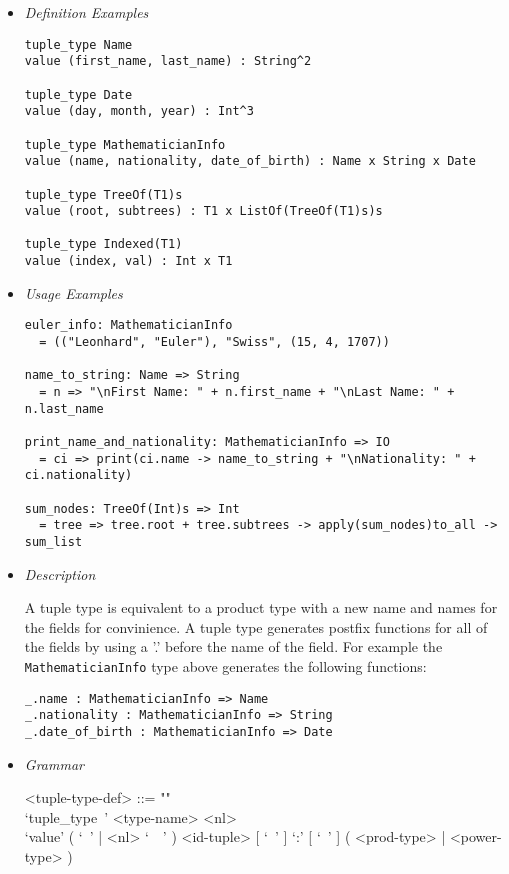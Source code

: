 \documentclass{article}
\begin{document}
\begin{itemize}
\item \textit{Definition Examples}

\begin{verbatim}
tuple_type Name
value (first_name, last_name) : String^2

tuple_type Date
value (day, month, year) : Int^3

tuple_type MathematicianInfo
value (name, nationality, date_of_birth) : Name x String x Date

tuple_type TreeOf(T1)s
value (root, subtrees) : T1 x ListOf(TreeOf(T1)s)s

tuple_type Indexed(T1)
value (index, val) : Int x T1
\end{verbatim}

\item \textit{Usage Examples}

\begin{verbatim}
euler_info: MathematicianInfo
  = (("Leonhard", "Euler"), "Swiss", (15, 4, 1707))

name_to_string: Name => String
  = n => "\nFirst Name: " + n.first_name + "\nLast Name: " + n.last_name

print_name_and_nationality: MathematicianInfo => IO
  = ci => print(ci.name -> name_to_string + "\nNationality: " + ci.nationality)

sum_nodes: TreeOf(Int)s => Int
  = tree => tree.root + tree.subtrees -> apply(sum_nodes)to_all -> sum_list
\end{verbatim}

\item \textit{Description}

A tuple type is equivalent to a product type with a new name  and names for the
fields for convinience. A tuple type generates postfix functions for all of
the fields by using a '.' before the name of the field. For example the
\texttt{MathematicianInfo} type above generates the following functions:
\begin{verbatim}
_.name : MathematicianInfo => Name
_.nationality : MathematicianInfo => String
_.date_of_birth : MathematicianInfo => Date
\end{verbatim}

\newpage

\item \textit{Grammar}

\begin{grammar}
<tuple-type-def> ::= ""\\
`tuple_type\ ' <type-name> <nl> \\
`value' ( `\ ' | <nl> `\ \ ' )
<id-tuple> [ `\ ' ] `:' [ `\ ' ] ( <prod-type> | <power-type> )


\end{grammar}
\end{itemize}
\end{document}
